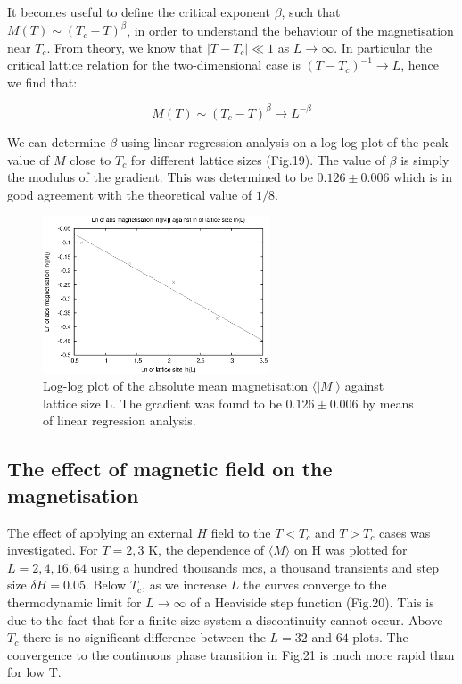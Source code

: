 \documentclass[a4paper]{article}
\begin{document}
It becomes useful to define the critical exponent $\beta$, such that $M(T) \sim (T_c -T)^{\beta}$, in order to understand the behaviour of the magnetisation near $T_c$. From theory, we know that $|T-T_c| \ll 1$ as $L \rightarrow \infty$. In particular the critical lattice relation for the two-dimensional case is $(T-T_c)^{-1} \rightarrow L $, hence we find that:

\begin{equation}
 M(T) \sim (T_c -T)^{\beta} \rightarrow L^{-\beta}
 \end{equation}
 
We can determine $\beta$ using linear regression analysis on a log-log plot of the peak value of $M$ close to $T_c$ for different lattice sizes (Fig.19). The value of $\beta$ is simply the modulus of the gradient. This was determined to be $0.126 \pm 0.006$ which is in good agreement with the theoretical value of $1/8$. 

\begin{figure} [H]
\centering
\includegraphics[width=0.6\textwidth]{beta.eps}
\caption{\label{fig:generic}Log-log plot of the absolute mean magnetisation $ \langle |M| \rangle $ against lattice size L. The gradient was found to be $0.126 \pm 0.006$ by means of linear regression analysis. }
\end{figure}

\subsection{The effect of magnetic field on the magnetisation}

The effect of applying an external $H$ field to the $T < T_c$ and $T > T_c$ cases was investigated.  For $T = 2,3$ K, the dependence of $ \langle M \rangle$ on H was plotted for $L = 2,4,16,64$ using a hundred thousands mcs, a thousand transients and step size $\delta H = 0.05$.  Below $T_c$, as we increase $L$ the curves converge to the thermodynamic limit for $L \rightarrow \infty$ of a Heaviside step function (Fig.20). This is due to the fact that for a finite size system a discontinuity cannot occur. Above $T_c$ there is no significant difference between the $L = 32$ and $64$ plots. The convergence to the continuous phase transition in Fig.21 is much more rapid than for low T.   
\end{document}
